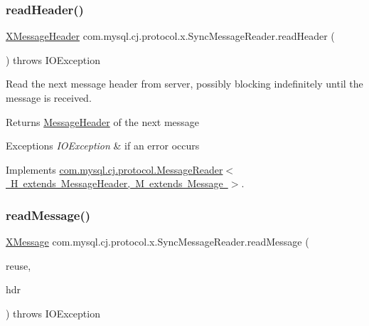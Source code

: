 \subsubsection{\texorpdfstring{read\+Header()}{readHeader()}}
{\footnotesize\ttfamily \mbox{\hyperlink{classcom_1_1mysql_1_1cj_1_1protocol_1_1x_1_1_x_message_header}{X\+Message\+Header}} com.\+mysql.\+cj.\+protocol.\+x.\+Sync\+Message\+Reader.\+read\+Header (\begin{DoxyParamCaption}{ }\end{DoxyParamCaption}) throws I\+O\+Exception}

Read the next message header from server, possibly blocking indefinitely until the message is received.

\begin{DoxyReturn}{Returns}
\mbox{\hyperlink{interfacecom_1_1mysql_1_1cj_1_1protocol_1_1_message_header}{Message\+Header}} of the next message 
\end{DoxyReturn}

\begin{DoxyExceptions}{Exceptions}
{\em I\+O\+Exception} & if an error occurs \\
\hline
\end{DoxyExceptions}


Implements \mbox{\hyperlink{interfacecom_1_1mysql_1_1cj_1_1protocol_1_1_message_reader_a09745b0e30f74fa13e2b32f22ce70cbb}{com.\+mysql.\+cj.\+protocol.\+Message\+Reader$<$ H extends Message\+Header, M extends Message $>$}}.

\mbox{\label{classcom_1_1mysql_1_1cj_1_1protocol_1_1x_1_1_sync_message_reader_a80429605aa58590c81c645fabf200f1e}} 
\subsubsection{\texorpdfstring{read\+Message()}{readMessage()}\hspace{0.1cm}{\footnotesize\ttfamily [1/2]}}
{\footnotesize\ttfamily \mbox{\hyperlink{classcom_1_1mysql_1_1cj_1_1protocol_1_1x_1_1_x_message}{X\+Message}} com.\+mysql.\+cj.\+protocol.\+x.\+Sync\+Message\+Reader.\+read\+Message (\begin{DoxyParamCaption}\item[{Optional$<$ \mbox{\hyperlink{classcom_1_1mysql_1_1cj_1_1protocol_1_1x_1_1_x_message}{X\+Message}} $>$}]{reuse,  }\item[{\mbox{\hyperlink{classcom_1_1mysql_1_1cj_1_1protocol_1_1x_1_1_x_message_header}{X\+Message\+Header}}}]{hdr }\end{DoxyParamCaption}) throws I\+O\+Exception}

